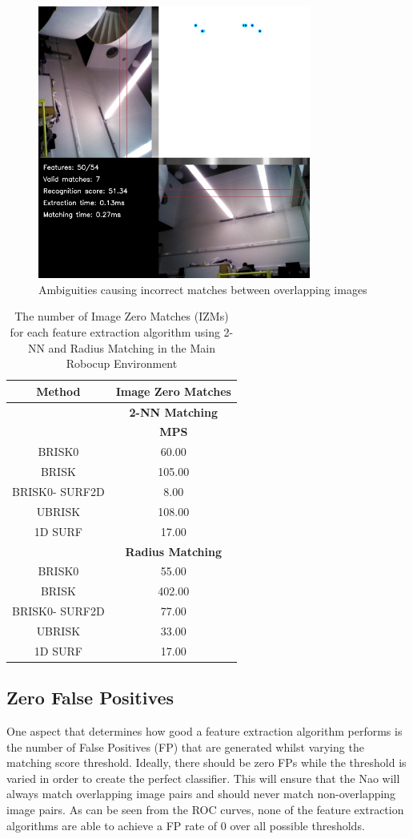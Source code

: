 \documentclass[11pt]{report}
\begin{document}
\begin{figure}
  \centering
    \includegraphics[width=0.8\textwidth]{../Drawings/Matching/nonmatching.jpg}
    \caption{Ambiguities causing incorrect matches between overlapping images} 
    \label{fig:ambiguities}
\end{figure}



\begin{table}
\caption{The number of Image Zero Matches (IZMs) for each feature extraction
algorithm using 2-NN and Radius Matching in the Main Robocup Environment}
\begin{tabular}{|c|c|}
\hline 
\textbf{Method} & \multicolumn{1}{c|}{\textbf{Image Zero Matches}}\tabularnewline
\hline 
 & \multicolumn{1}{c|}{\textbf{2-NN Matching}}\tabularnewline
\hline 
 & \textbf{MPS}\tabularnewline
\hline 
\hline 
BRISK0 & 60.00\tabularnewline
\hline 
BRISK & 105.00\tabularnewline
\hline 
BRISK0- SURF2D & 8.00\tabularnewline
\hline 
UBRISK & 108.00\tabularnewline
\hline 
1D SURF & 17.00\tabularnewline
\hline 
 & \multicolumn{1}{c|}{\textbf{Radius Matching}}\tabularnewline
\hline 
BRISK0 & 55.00\tabularnewline
\hline 
BRISK & 402.00\tabularnewline
\hline 
BRISK0- SURF2D & 77.00\tabularnewline
\hline 
UBRISK & 33.00\tabularnewline
\hline 
1D SURF & 17.00\tabularnewline
\hline 
\end{tabular}
\label{tab:mrd_izm}
\end{table}

\subsection{Zero False Positives}
\label{sec:zfp}
One aspect that determines how good a feature extraction algorithm performs is the number of False Positives (FP) that are generated whilst varying the matching score threshold. Ideally, there should be zero FPs while the threshold is varied in order to create the perfect classifier. This will ensure that the Nao will always match overlapping image pairs and should never match non-overlapping image pairs. As can be seen from the ROC curves, none of the feature extraction algorithms are able to achieve a FP rate of $0$ over all possible thresholds.\\
\end{document}
